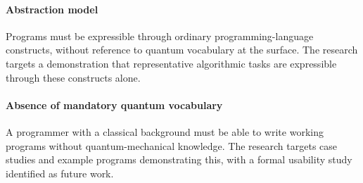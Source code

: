 \paragraph{Abstraction model} Programs must be expressible through ordinary programming-language constructs, without reference to quantum vocabulary at the surface.
The research targets a demonstration that representative algorithmic tasks are expressible through these constructs alone.

\paragraph{Absence of mandatory quantum vocabulary} A programmer with a classical background must be able to write working programs without quantum-mechanical knowledge.
The research targets case studies and example programs demonstrating this, with a formal usability study identified as future work.